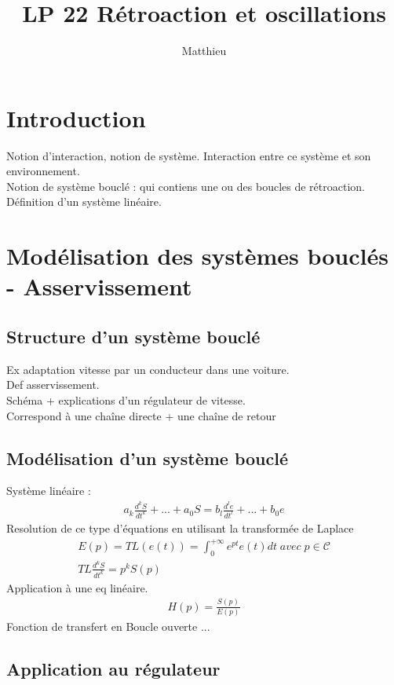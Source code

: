 \documentclass[12pt,prb,aps,epsf]{report}
\begin{document}
	
	\title{LP 22 Rétroaction et oscillations}
	\author{Matthieu}
	
	\maketitle
	
	\tableofcontents
	
	\pagebreak
	
	
\section{Introduction}
Notion d'interaction, notion de système.
Interaction entre ce système et son environnement.\\
Notion de système bouclé : qui contiens une ou des boucles de rétroaction.\\
Définition d'un système linéaire.
\section{Modélisation des systèmes bouclés - Asservissement}
\subsection{Structure d'un système bouclé}
Ex adaptation vitesse par un conducteur dans une voiture.\\
Def asservissement.\\
Schéma + explications d'un régulateur de vitesse.\\
Correspond à une chaîne directe + une chaîne de retour
\subsection{Modélisation d'un système bouclé}
Système linéaire :
\begin{eqnarray}
a_k\frac{d^k S}{dt^k} + ... + a_0S=b_l\frac{d^l e}{dt^l} + ... + b_0e
\end{eqnarray}
Resolution de ce type d'équations en utilisant la transformée de Laplace
\begin{eqnarray}
E(p)=TL(e(t))=\int_0^{+\infty}e^{pt}e(t)dt\;avec \; p\in\mathcal{C}\\
TL\frac{d^kS}{dt^k}=p^kS(p)
\end{eqnarray}
Application à une eq linéaire.
\begin{eqnarray}
H(p)=\frac{S(p)}{E(p)}
\end{eqnarray}
Fonction de transfert en Boucle ouverte ...
\subsection{Application au régulateur}
\end{document}

